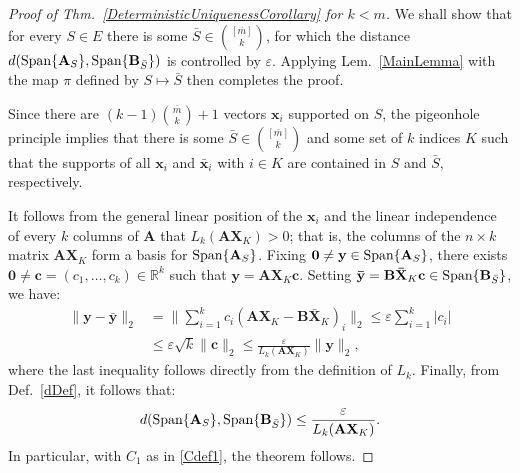 \documentclass[9pt,twocolumn]{pnas-new}
\begin{document}
\begin{proof}[Proof of Thm.~\ref{DeterministicUniquenessCorollary} for $k < m$] 
We shall show that for every $S \in E$ there is some $\bar S \in {[\bar m] \choose k}$, for which the distance $d(\text{\rm Span}\{\mathbf{A}_S\}, \text{\rm Span}\{\mathbf{B}_{\bar S}\})$ is controlled by $\varepsilon$. Applying Lem.~\ref{MainLemma} with the map $\pi$ defined by $S \mapsto \bar S$ then completes the proof.  

Since there are $(k-1){\bar m \choose k}+1$ vectors $\mathbf{x}_i$ supported on $S$, the pigeonhole principle implies that there is some $\bar S \in {[\bar m] \choose k}$ and some set of $k$ indices $K$ such that the supports of all $\mathbf{x}_i$ and $\mathbf{\bar x}_i$ with $i \in K$ are contained in $S$ and $\bar S$, respectively.

It follows from the general linear position of the $\mathbf{x}_i$ and the linear independence of every $k$ columns of $\mathbf{A}$ that $L_k(\mathbf{AX}_{K}) > 0$; that is, the columns of the $n \times k$ matrix $\mathbf{AX}_K$ form a basis for $\text{\rm Span}\{\mathbf{A}_{S}\}$. Fixing $\mathbf{0} \neq \mathbf{y} \in \text{\rm Span}\{\mathbf{A}_{S}\}$, there exists $\mathbf{0} \neq \mathbf{c} = (c_1, \ldots, c_k) \in \mathbb{R}^k$ such that $\mathbf{y} = \mathbf{AX}_K\mathbf{c}$. Setting \mbox{$\mathbf{\bar{y}} = \mathbf{B\bar{X}}_K\mathbf{c} \in \text{\rm Span}\{\mathbf{B}_{\bar S}\}$}, we have:
\begin{align*}
\|\mathbf{y} - \mathbf{\bar{y}}\|_2 
&= \|\sum_{i=1}^k c_i(\mathbf{AX}_K - \mathbf{B\bar{X}}_K)_i\|_2
\leq \varepsilon \sum_{i=1}^k |c_i| \\
&\leq \varepsilon \sqrt{k}  \|\mathbf{c}\|_2 
\leq \frac{\varepsilon}{L_k(\mathbf{AX}_K)} \|\mathbf{y}\|_2,
\end{align*}
where the last inequality follows directly from the definition of $L_k$. Finally, from Def.~\ref{dDef}, it follows that:
\begin{align}\label{rhs222}
d(\text{\rm Span}\{\mathbf{A}_S\}, \text{\rm Span}\{\mathbf{B}_{\bar S}\}) 
\leq \frac{\varepsilon}{  L_k(\mathbf{AX}_{K}) }.
\end{align}
In particular, with $C_1$ as in \eqref{Cdef1}, the theorem follows.
\end{proof}
\end{document}
